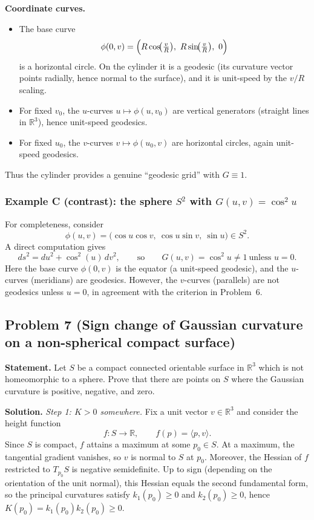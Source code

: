 \documentclass[12pt,a4paper]{article}
\theoremstyle{plain}
\theoremstyle{definition}      %
\begin{document}
	\medskip
	\textbf{Coordinate curves.}
	\begin{itemize}
		\item The base curve
		\[
		\phi(0,v)=\Bigl(R\cos\!\bigl(\tfrac{v}{R}\bigr),\ R\sin\!\bigl(\tfrac{v}{R}\bigr),\ 0\Bigr)
		\]
		is a horizontal circle. On the cylinder it is a geodesic (its curvature vector points radially, hence normal to
		the surface), and it is unit-speed by the $v/R$ scaling.
		\item For fixed $v_0$, the $u$-curves $u\mapsto \phi(u,v_0)$ are vertical generators (straight lines in
		$\mathbb{R}^3$), hence unit-speed geodesics.
		\item For fixed $u_0$, the $v$-curves $v\mapsto \phi(u_0,v)$ are horizontal circles, again unit-speed geodesics.
	\end{itemize}
	Thus the cylinder provides a genuine ``geodesic grid'' with $G\equiv 1$.
	
	\subsubsection*{Example C (contrast): the sphere $S^2$ with $G(u,v)=\cos^2 u$}
	For completeness, consider
	\[
	\phi(u,v)=\bigl(\cos u\cos v,\ \cos u\sin v,\ \sin u\bigr)\in S^2.
	\]
	A direct computation gives
	\[
	ds^2 = du^2 + \cos^2(u)\,dv^2,
	\qquad\text{so}\qquad
	G(u,v)=\cos^2 u\neq 1 \ \text{unless } u=0.
	\]
	Here the base curve $\phi(0,v)$ is the equator (a unit-speed geodesic), and the $u$-curves (meridians) are
	geodesics. However, the $v$-curves (parallels) are not geodesics unless $u=0$, in agreement with the criterion
	in Problem~6.
	
	\subsection*{Problem 7 (Sign change of Gaussian curvature on a non-spherical compact surface)}
	
	\textbf{Statement.}
	Let $S$ be a compact connected orientable surface in $\mathbb{R}^3$ which is not homeomorphic to a sphere.
	Prove that there are points on $S$ where the Gaussian curvature is positive, negative, and zero.
	
	\textbf{Solution.}
	\textit{Step 1: $K>0$ somewhere.}
	Fix a unit vector $v\in\mathbb{R}^3$ and consider the height function
	\[
	f:S\to\mathbb{R},\qquad f(p)=\langle p,v\rangle .
	\]
	Since $S$ is compact, $f$ attains a maximum at some $p_0\in S$.
	At a maximum, the tangential gradient vanishes, so $v$ is normal to $S$ at $p_0$.
	Moreover, the Hessian of $f$ restricted to $T_{p_0}S$ is negative semidefinite.
	Up to sign (depending on the orientation of the unit normal), this Hessian equals the second fundamental form,
	so the principal curvatures satisfy $k_1(p_0)\ge 0$ and $k_2(p_0)\ge 0$, hence $K(p_0)=k_1(p_0)k_2(p_0)\ge 0$.
	
\end{document}
